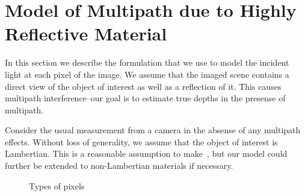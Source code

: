 \section{Model of Multipath due to Highly Reflective Material}
In this section we describe the formulation that we use to model the incident light at each pixel of the image.
We assume that the imaged scene contains a direct view of the object of interest as well as a reflection of it.
This causes multipath interference--our goal is to estimate true depths in the presense of multipath.

Consider the usual measurement from a camera in the absense of any multipath effects.
Without loss of generality, we assume that the object of interest is Lambertian.
This is a reasonable assumption to make~\cite{somepaper}, but our model could further be extended to non-Lambertian materials if necessary.
%
\begin{figure}
\centering
  \caption{Types of pixels}
  \label{fig:types_of_pixels} 
\end{figure}


